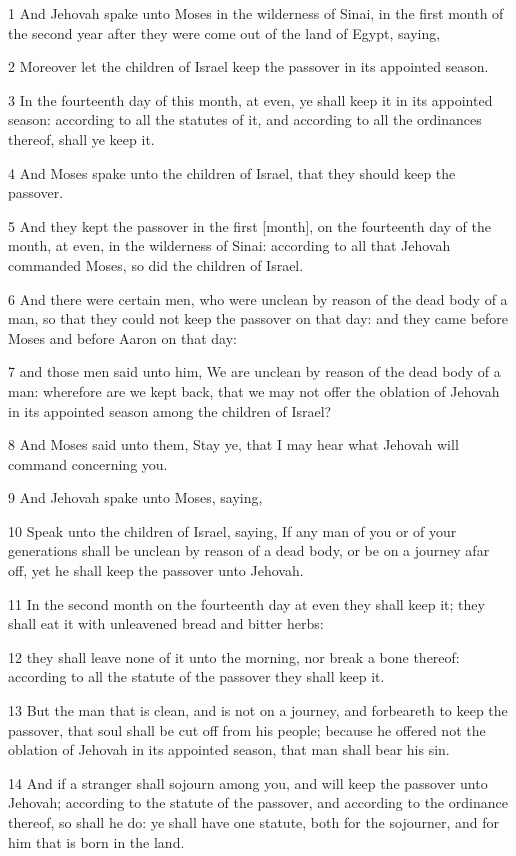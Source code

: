 \par 1 And Jehovah spake unto Moses in the wilderness of Sinai, in the first month of the second year after they were come out of the land of Egypt, saying,
\par 2 Moreover let the children of Israel keep the passover in its appointed season.
\par 3 In the fourteenth day of this month, at even, ye shall keep it in its appointed season: according to all the statutes of it, and according to all the ordinances thereof, shall ye keep it.
\par 4 And Moses spake unto the children of Israel, that they should keep the passover.
\par 5 And they kept the passover in the first [month], on the fourteenth day of the month, at even, in the wilderness of Sinai: according to all that Jehovah commanded Moses, so did the children of Israel.
\par 6 And there were certain men, who were unclean by reason of the dead body of a man, so that they could not keep the passover on that day: and they came before Moses and before Aaron on that day:
\par 7 and those men said unto him, We are unclean by reason of the dead body of a man: wherefore are we kept back, that we may not offer the oblation of Jehovah in its appointed season among the children of Israel?
\par 8 And Moses said unto them, Stay ye, that I may hear what Jehovah will command concerning you.
\par 9 And Jehovah spake unto Moses, saying,
\par 10 Speak unto the children of Israel, saying, If any man of you or of your generations shall be unclean by reason of a dead body, or be on a journey afar off, yet he shall keep the passover unto Jehovah.
\par 11 In the second month on the fourteenth day at even they shall keep it; they shall eat it with unleavened bread and bitter herbs:
\par 12 they shall leave none of it unto the morning, nor break a bone thereof: according to all the statute of the passover they shall keep it.
\par 13 But the man that is clean, and is not on a journey, and forbeareth to keep the passover, that soul shall be cut off from his people; because he offered not the oblation of Jehovah in its appointed season, that man shall bear his sin.
\par 14 And if a stranger shall sojourn among you, and will keep the passover unto Jehovah; according to the statute of the passover, and according to the ordinance thereof, so shall he do: ye shall have one statute, both for the sojourner, and for him that is born in the land.
